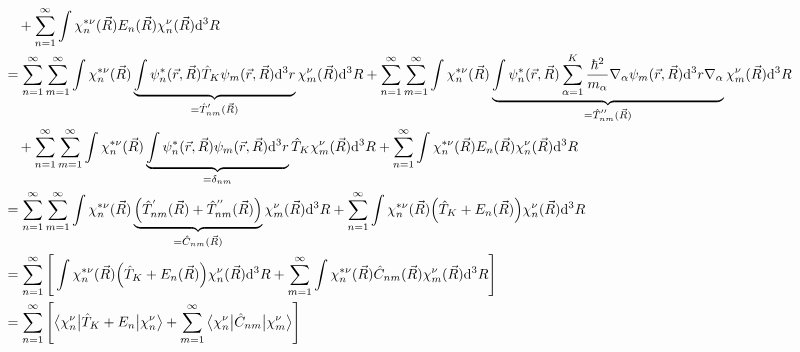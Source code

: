 \documentclass[9pt]{report}
\begin{document}
\begin{align}
&\quad+\sum_{n=1}^{\infty}\int\chi_{n}^{*\nu}(\vec{R})E_{n}(\vec{R})\chi_{n}^{\nu}(\vec{R})\mathrm{d}^3R\notag\\
&=\sum_{n=1}^{\infty}\sum_{m=1}^{\infty}\int\chi_{n}^{*\nu}(\vec{R})\underbrace{\int\psi_{n}^{*}(\vec{r},\vec{R})\hat{T}_{K}\psi_{m}(\vec{r},\vec{R})\mathrm{d}^3r}_{=\hat{T}_{nm}^{'}(\vec{R})}\chi_{m}^{\nu}(\vec{R})\mathrm{d}^3R+\sum_{n=1}^{\infty}\sum_{m=1}^{\infty}\int\chi_{n}^{*\nu}(\vec{R})\underbrace{\int\psi_{n}^{*}(\vec{r},\vec{R})\sum_{\alpha=1}^{K}\frac{\hbar^2}{m_{\alpha}}\nabla_{\alpha}\psi_{m}(\vec{r},\vec{R})\mathrm{d}^3r\nabla_{\alpha}}_{=\hat{T}_{nm}^{''}(\vec{R})}\chi_{m}^{\nu}(\vec{R})\mathrm{d}^3R\notag\\
&\quad + \sum_{n=1}^{\infty}\sum_{m=1}^{\infty}\int\chi_{n}^{*\nu}(\vec{R})\underbrace{\int\psi_{n}^{*}(\vec{r},\vec{R})\psi_{m}(\vec{r},\vec{R})\mathrm{d}^3r}_{=\delta_{nm}}\hat{T}_{K}\chi_{m}^{\nu}(\vec{R})\mathrm{d}^3R+\sum_{n=1}^{\infty}\int\chi_{n}^{*\nu}(\vec{R})E_{n}(\vec{R})\chi_{n}^{\nu}(\vec{R})\mathrm{d}^3R\notag\\
&= \sum_{n=1}^{\infty}\sum_{m=1}^{\infty}\int\chi_{n}^{*\nu}(\vec{R})\underbrace{\Big(\hat{T}_{nm}^{'}(\vec{R})+\hat{T}_{nm}^{''}(\vec{R})\Big)}_{=\hat{C}_{nm}(\vec{R})}\chi_{m}^{\nu}(\vec{R})\mathrm{d}^3R +\sum_{n=1}^{\infty}\int\chi_{n}^{*\nu}(\vec{R})\Big(\hat{T}_{K}+E_{n}(\vec{R})\Big)\chi_{n}^{\nu}(\vec{R})\mathrm{d}^3R\notag\\
&=\sum_{n=1}^{\infty}\Bigg[\int\chi_{n}^{*\nu}(\vec{R})\Big(\hat{T}_{K}+E_{n}(\vec{R})\Big)\chi_{n}^{\nu}(\vec{R})\mathrm{d}^3R+\sum_{m=1}^{\infty}\int\chi_{n}^{*\nu}(\vec{R})\hat{C}_{nm}(\vec{R})\chi_{m}^{\nu}(\vec{R})\mathrm{d}^3R\Bigg]\notag\\
&= \sum_{n=1}^{\infty}\Bigg[\big\langle\chi_{n}^{\nu}\big|\hat{T}_{K}+E_{n}\big|\chi_{n}^{\nu}\big\rangle +\sum_{m=1}^{\infty}\big\langle\chi_{n}^{\nu}\big|\hat{C}_{nm}\big|\chi_{m}^{\nu}\big\rangle\Bigg]\notag
\end{align}
\normalsize
\end{document}

